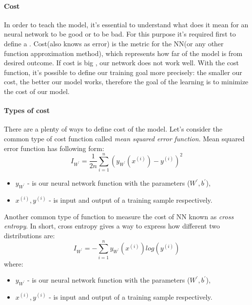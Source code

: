 \paragraph{Cost} In order to teach the model, it's essential to understand
what does it mean for an neural network to be good or to be bad. For this purpose
it's required first to define a . Cost(also knows as error) is the metric
for the NN(or any other function approximation method), which represents how far of
the model is from desired outcome. If cost is big , our network does not work well.
With the cost function, it's possible
to define our training goal more precisely: the smaller our cost, the better our
model works, therefore the goal of the learning is to minimize the cost of our model.

\paragraph{Types of cost} There are a plenty of ways to define cost of the model.
Let's consider the common type of cost function called \emph{mean squared error function}.
Mean squared error function has following form:
\begin{equation} \label{eq:mse}
	I_{W^\prime} = \frac{1}{2n} \sum_{i=1}^n (y_{W^\prime}(x^{(i)}) - y^{(i)})^2
\end{equation}
\begin{itemize}
	\item $y_{W^\prime}$ - is our neural network function with the parameters ($W^\prime, b^\prime$),
	\item $x^{(i)}, y^{(i)}$ - is input and output of a training sample respectively.
\end{itemize}

Another common type of function to measure the cost of NN known as \emph{cross entropy}.
In short, cross entropy gives a way to express how different two distributions are:
\begin{equation} \label{eq:cross_entr}
	I_{W^\prime} = - \sum_{i=1}^n  y_{W^\prime}(x^{(i)}) log(y^{(i)})
\end{equation}
where:
\begin{itemize}
	\item $y_{W^\prime}$ - is our neural network function with the parameters ($W^\prime, b^\prime$),
	\item $x^{(i)}, y^{(i)}$ - is input and output of a training sample respectively.
\end{itemize}
\cite{Nielsen2015}


